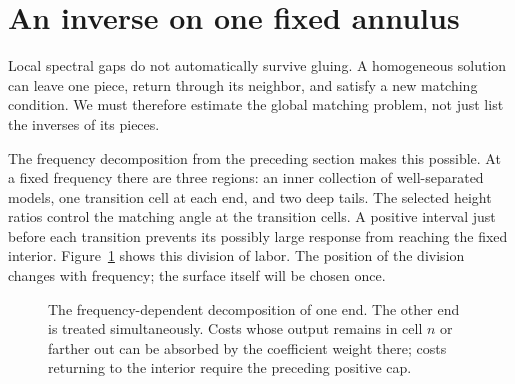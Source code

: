 \section{An inverse on one fixed annulus}
\label{sec:radial-reference-inverse}

Local spectral gaps do not automatically survive gluing.  A homogeneous
solution can leave one piece, return through its neighbor, and satisfy a
new matching condition.  We must therefore estimate the global matching
problem, not just list the inverses of its pieces.

The frequency decomposition from the preceding section makes this
possible.  At a fixed frequency there are three regions: an inner
collection of well-separated models, one transition cell at each end,
and two deep tails.  The selected height ratios control the matching
angle at the transition cells.  A positive interval just before each
transition prevents its possibly large response from reaching the fixed
interior.  Figure~\ref{fig:frequency-regions} shows this division of labor.
The position of the division changes with frequency; the surface itself
will be chosen once.

\begin{figure}[htbp]
\centering
{}
\caption{The frequency-dependent decomposition of one end.
The other end is treated simultaneously.  Costs whose output remains
in cell $n$ or farther out can be absorbed by the coefficient weight
there; costs returning to the interior require the preceding positive cap.}
\label{fig:frequency-regions}
\end{figure}

